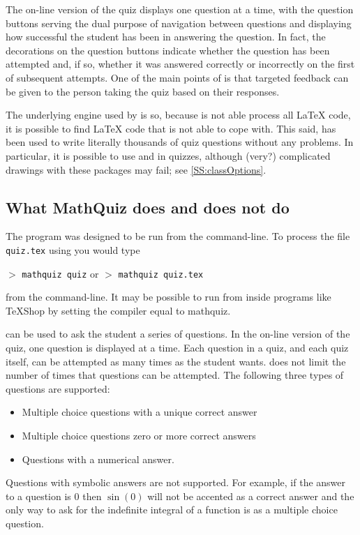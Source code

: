 \documentclass[svgnames]{article}
\begin{document}
    The on-line version of the quiz displays one question at a time,
    with the question buttons serving the dual purpose of navigation
    between questions and displaying how successful the student has been
    in answering the question. In fact, the decorations on the question
    buttons indicate whether the question has been attempted and, if so,
    whether it was answered correctly or incorrectly on the first of
    subsequent attempts. One of the main points of \MathQuiz is that
    targeted feedback can be given to the person taking the quiz based
    on their responses.

    The underlying engine used by \MathQuiz is  so, because
     is not able process all \LaTeX{} code, it is possible to
    find \LaTeX{} code that \MathQuiz is not able to cope with.
    This said, \MathQuiz has been used to write literally thousands of quiz
    questions without any problems. In particular, it is possible to use
     and  in \MathQuiz quizzes, although
    (very?) complicated drawings with these packages may fail; see
    \autoref{SS:classOptions}.

\subsection{What MathQuiz does and does not do}

    The \MathQuiz program was designed to be run from the command-line.
    To process the file \texttt{quiz.tex} using \MathQuiz you would
    type

    $>$ \Verb|mathquiz quiz| \qquad or \qquad $>$ \Verb|mathquiz quiz.tex|

    \noindent from the command-line. It may be possible to run \MathQuiz
    from inside programs like \TeX Shop by setting the compiler equal to
    \textsf{mathquiz}.

    \MathQuiz can be used to ask the student a series of questions. In
    the on-line version of the quiz, one question is displayed at a
    time. Each question in a quiz, and each quiz itself, can be
    attempted as many times as the student wants. \MathQuiz does not
    limit the number of times that questions can be attempted.
    The following three types of questions are supported:
    \begin{itemize}
      \item Multiple choice questions with a unique correct answer
      \item Multiple choice questions zero or more correct answers
      \item Questions with a numerical answer.
    \end{itemize}
    Questions with symbolic answers are not supported.
    For example, if the answer to a question is $0$ then $\sin(0)$ will
    not be accented as a correct answer and the only way to ask for the
    indefinite integral of a function is as a multiple choice question.
\end{document}
